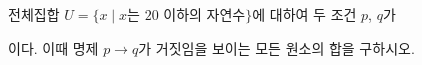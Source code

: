 전체집합 $U=\{x \mid x$는 $20$ 이하의 자연수$\}$에 대하여 두 조건 $p$, $q$가 \par\smallskip{}\par\smallskip\noindent 이다. 이때 명제 $p\longrightarrow q$가 거짓임을 보이는 모든 원소의 합을 구하시오.
